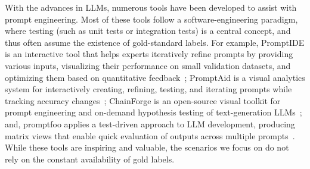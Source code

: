 With the advances in LLMs, numerous tools have been developed to assist with prompt engineering. 
Most of these tools follow a software-engineering paradigm, where testing (such as unit tests or integration tests) is a central concept, and thus often assume the existence of gold-standard labels.
For example, PromptIDE is an interactive tool that helps experts iteratively refine prompts by providing various inputs, visualizing their performance on small validation datasets, and optimizing them based on quantitative feedback~\cite{strobelt2022interactive}; 
PromptAid is a visual analytics system for interactively creating, refining, testing, and iterating prompts while tracking accuracy changes~\cite{mishra2023promptaid};
ChainForge is an open-source visual toolkit for prompt engineering and on-demand hypothesis testing of text-generation LLMs~\cite{arawjo2024chainforge};
and, promptfoo applies a test-driven approach to LLM development, producing matrix views that enable quick evaluation of outputs across multiple prompts~\cite{webster2023promptfoo}.
While these tools are inspiring and valuable, the scenarios we focus on do not rely on the constant availability of gold labels.



